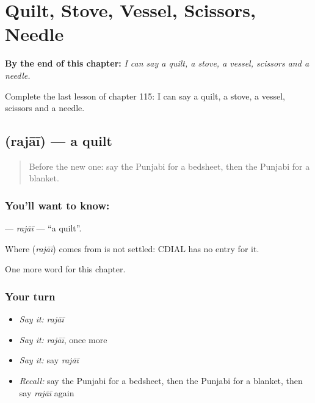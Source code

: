 
\chapter{Quilt, Stove, Vessel, Scissors, Needle}
\label{ch:pa-quilt-stove-vessel-scissors-needle}

\begin{chapteropening}
\textbf{By the end of this chapter:} \emph{I can say a quilt, a stove, a vessel, scissors and a needle.}

Complete the last lesson of chapter 115: I can say a quilt, a stove, a vessel, scissors and a needle.
\end{chapteropening}

\section[\texorpdfstring{\pa{ਰਜਾਈ} (rajāī)}{ਰਜਾਈ (rajāī)}]{ (rajāī) — a quilt}

\label{lesson:PA-C115-rajai}



\begin{quote}
Before the new one: say the Punjabi for a bedsheet, then the Punjabi for a blanket.
\end{quote}

\subsection*{You'll want to know: }
\textbf{} — \emph{rajāī} — \textquotedblleft{}a quilt\textquotedblright{}.

\begin{cousinweb}
Where \textbf{} (\emph{rajāī}) comes from is not settled: CDIAL has no entry for it.
\end{cousinweb}

\begin{grammarlens}[title={What you've built}]
One more word for this chapter.
\end{grammarlens}

\subsection*{Your turn}
\begin{itemize}
\raggedright
  \item \emph{Say it:} \emph{rajāī}
  \item \emph{Say it:} \emph{rajāī}, once more
  \item \emph{Say it:} say \emph{rajāī}
  \item \emph{Recall:} say the Punjabi for a bedsheet, then the Punjabi for a blanket, then say \emph{rajāī} again
\end{itemize}

